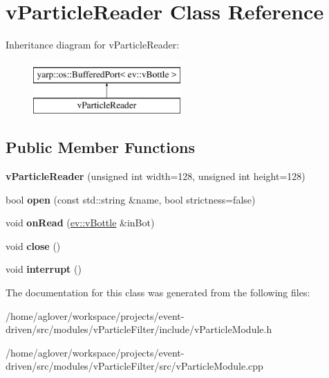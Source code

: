 \hypertarget{classvParticleReader}{}\section{v\+Particle\+Reader Class Reference}
\label{classvParticleReader}
Inheritance diagram for v\+Particle\+Reader\+:\begin{figure}[H]
\begin{center}
\leavevmode
\includegraphics[height=2.000000cm]{classvParticleReader}
\end{center}
\end{figure}
\subsection*{Public Member Functions}
\begin{DoxyCompactItemize}
\item 
{\bfseries v\+Particle\+Reader} (unsigned int width=128, unsigned int height=128)\hypertarget{classvParticleReader_aa845b76dd7066a16984dd3277a8f2e6d}{}\label{classvParticleReader_aa845b76dd7066a16984dd3277a8f2e6d}

\item 
bool {\bfseries open} (const std\+::string \&name, bool strictness=false)\hypertarget{classvParticleReader_a758adac809850f3fc1f01d2502d609bc}{}\label{classvParticleReader_a758adac809850f3fc1f01d2502d609bc}

\item 
void {\bfseries on\+Read} (\hyperlink{classev_1_1vBottle}{ev\+::v\+Bottle} \&in\+Bot)\hypertarget{classvParticleReader_af4bb9d631985a90d797416eca04777bb}{}\label{classvParticleReader_af4bb9d631985a90d797416eca04777bb}

\item 
void {\bfseries close} ()\hypertarget{classvParticleReader_a727d94974d16c502ac2518c5760e0fcc}{}\label{classvParticleReader_a727d94974d16c502ac2518c5760e0fcc}

\item 
void {\bfseries interrupt} ()\hypertarget{classvParticleReader_af7e95400429bb07bc9a438f8a163023e}{}\label{classvParticleReader_af7e95400429bb07bc9a438f8a163023e}

\end{DoxyCompactItemize}


The documentation for this class was generated from the following files\+:\begin{DoxyCompactItemize}
\item 
/home/aglover/workspace/projects/event-\/driven/src/modules/v\+Particle\+Filter/include/v\+Particle\+Module.\+h\item 
/home/aglover/workspace/projects/event-\/driven/src/modules/v\+Particle\+Filter/src/v\+Particle\+Module.\+cpp\end{DoxyCompactItemize}
